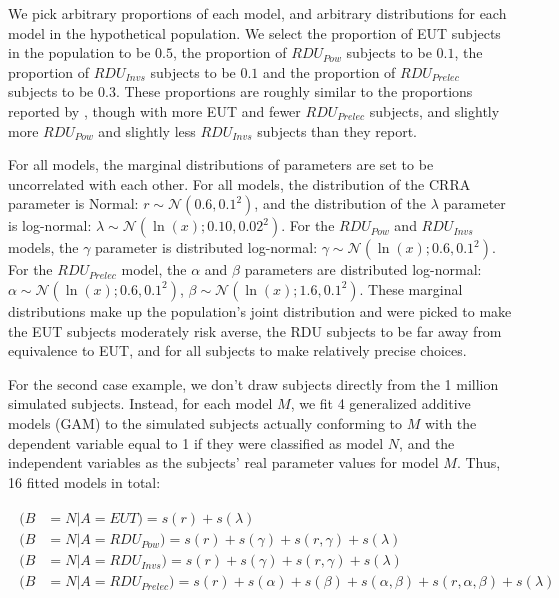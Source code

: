 \documentclass[../main.tex]{subfiles}
\begin{document}
We pick arbitrary proportions of each model, and arbitrary distributions for each model in the hypothetical population.
We select the proportion of EUT subjects in the population to be $0.5$, the proportion of $\mathit{RDU_{Pow}}$ subjects to be $0.1$, the proportion of $\mathit{RDU_{Invs}}$ subjects to be $0.1$ and the proportion of $\mathit{RDU_{Prelec}}$ subjects to be $0.3$.
These proportions are roughly similar to the proportions reported by \textcite[108]{Harrison2016}, though with more EUT and fewer $\mathit{RDU_{Prelec}}$ subjects, and slightly more $\mathit{RDU_{Pow}}$ and slightly less $\mathit{RDU_{Invs}}$ subjects than they report.

For all models, the marginal distributions of parameters are set to be uncorrelated with each other.
For all models, the distribution of the CRRA parameter is Normal: $r \sim \mathcal{N}(0.6, 0.1^2)$, and the distribution of the $\lambda$ parameter is log-normal: $\lambda \sim \mathcal{N}(\ln(x);0.10, 0.02^2)$.
For the $\mathit{RDU_{Pow}}$ and $\mathit{RDU_{Invs}}$ models, the $\gamma$ parameter is distributed log-normal: $\gamma \sim \mathcal{N}(\ln(x);0.6, 0.1^2)$.
For the $\mathit{RDU_{Prelec}}$ model, the $\alpha$ and $\beta$ parameters are distributed log-normal: $\alpha \sim \mathcal{N}(\ln(x);0.6, 0.1^2)$, $\beta \sim \mathcal{N}(\ln(x);1.6, 0.1^2)$.
These marginal distributions make up the population's joint distribution and were picked to make the EUT subjects moderately risk averse, the RDU subjects to be far away from equivalence to EUT, and for all subjects to make relatively precise choices.

For the second case example, we don't draw subjects directly from the 1 million simulated subjects.
Instead, for each model $M$, we fit 4 generalized additive models (GAM) \parencite{Hastie1986} to the simulated subjects actually conforming to $M$ with the dependent variable equal to 1 if they were classified as model $N$, and the independent variables as the subjects' real parameter values for model $M$.
Thus, 16 fitted models in total:

\begin{align}
	\label{eq4:GAM}
	\begin{split}
		(B &= N | A = EUT)                   = s(r) + s(\lambda)\\
		(B &= N | A = \mathit{RDU_{Pow}})    = s(r) + s(\gamma) + s(r, \gamma) + s(\lambda)\\
		(B &= N | A = \mathit{RDU_{Invs}})   = s(r) + s(\gamma) + s(r, \gamma) + s(\lambda)\\
		(B &= N | A = \mathit{RDU_{Prelec}}) = s(r) + s(\alpha) + s(\beta) +s(\alpha, \beta) + s(r, \alpha, \beta) + s(\lambda)
	\end{split}
\end{align}
\end{document}
